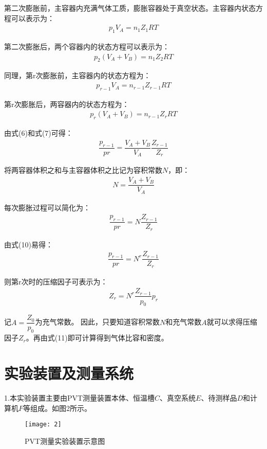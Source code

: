 \documentclass[UTF8,a4paper,10pt]{ctexart}
\begin{document}
    第二次膨胀前，主容器内充满气体工质，膨胀容器处于真空状态。主容器内状态方程可以表示为：
    \begin{align}
    p_{1}V_{A}=n_{1}Z_{1}RT
    \end{align}
    
    第二次膨胀后，两个容器内的状态方程可以表示为： 
    \begin{align}
    p_{2}(V_{A}+V_{B})=n_{1}Z_{2}RT
    \end{align}
    
    同理，第r次膨胀前，主容器内的状态方程为：
    \begin{align}
    p_{r-1}V_{A}=n_{r-1}Z_{r-1}RT
    \end{align}
    
    第r次膨胀后，两容器内的状态方程为：
    \begin{align}
    p_{r}(V_{A}+V_{B})=n_{r-1}Z_{r}RT
    \end{align}
    
    由式(6)和式(7)可得：
    \begin{align}
    \dfrac{p_{r-1}}{p{r}}=\dfrac{V_{A}+V_{B}}{V_{A}}\dfrac{Z_{r-1}}{Z_{r}}
    \end{align}
    
    将两容器体积之和与主容器体积之比记为容积常数$N$，即：
    \begin{align}
    N=\dfrac{V_{A}+V_{B}}{V_{A}}
    \end{align}
    
    每次膨胀过程可以简化为：
    \begin{align}
    \dfrac{p_{r-1}}{p{r}}=N\dfrac{Z_{r-1}}{Z_{r}}
    \end{align}
    
    由式(10)易得：
    \begin{align}
    \dfrac{p_{r-1}}{p{r}}=N^{r}\dfrac{Z_{r-1}}{Z_{r}}
    \end{align}
    
    则第r次时的压缩因子可表示为：
    \begin{align}
    Z_{r}=N^{r}\dfrac{Z_{r-1}}{p_{0}}p_{r}
    \end{align}
    
    记$A=\dfrac{Z_{0}}{p_{0}}$为充气常数。
    因此，只要知道容积常数$N$和充气常数$A$就可以求得压缩因子$Z_{r}$。再由式(11)即可计算得到气体比容和密度。
    \section{实验装置及测量系统}
    1.本实验装置主要由PVT测量装置本体、恒温槽$C$、真空系统$E$、待测样品$D$和计算机$F$等组成。如图2所示。
    \begin{figure}[h]
    	\centering
    	\texttt{[image: 2]}
    	\caption{ PVT测量实验装置示意图}
    \end{figure}
\end{document}
